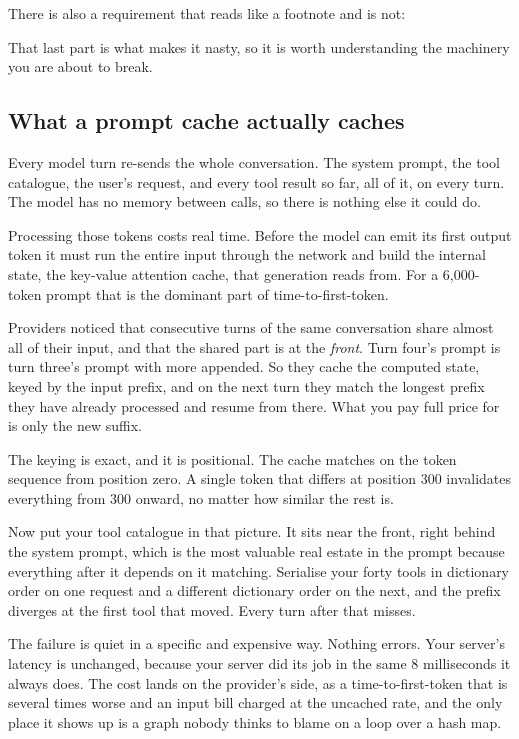 There is also a requirement that reads like a footnote and is not:


That last part is what makes it nasty, so it is worth understanding the
machinery you are about to break.

\subsection{What a prompt cache actually caches}

Every model turn re-sends the whole conversation. The system prompt, the tool
catalogue, the user's request, and every tool result so far, all of it, on every
turn. The model has no memory between calls, so there is nothing else it could
do.

Processing those tokens costs real time. Before the model can emit its first
output token it must run the entire input through the network and build the
internal state, the key-value attention cache, that generation reads from. For a
6,000-token prompt that is the dominant part of time-to-first-token.

Providers noticed that consecutive turns of the same conversation share almost
all of their input, and that the shared part is at the \emph{front}. Turn four's
prompt is turn three's prompt with more appended. So they cache the computed
state, keyed by the input prefix, and on the next turn they match the longest
prefix they have already processed and resume from there. What you pay full
price for is only the new suffix.

The keying is exact, and it is positional. The cache matches on the token
sequence from position zero. A single token that differs at position 300
invalidates everything from 300 onward, no matter how similar the rest is.

Now put your tool catalogue in that picture. It sits near the front, right
behind the system prompt, which is the most valuable real estate in the prompt
because everything after it depends on it matching. Serialise your forty tools
in dictionary order on one request and a different dictionary order on the next,
and the prefix diverges at the first tool that moved. Every turn after that
misses.

The failure is quiet in a specific and expensive way. Nothing errors. Your
server's latency is unchanged, because your server did its job in the same 8
milliseconds it always does. The cost lands on the provider's side, as a
time-to-first-token that is several times worse and an input bill charged at the
uncached rate, and the only place it shows up is a graph nobody thinks to blame
on a loop over a hash map.


